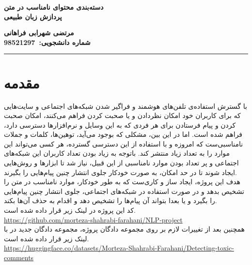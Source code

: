 
\def \Subject {گزارش فاز اول پروژه}
\def \Subject {دسته‌بندی محتوای نامناسب در متن}
\def \Course {پردازش زبان طبیعی}
\def \Author {مرتضی شهرابی فراهانی}
\def \StudentNumber {98521297}

\begin{center}
\vspace{.4cm}
{\bf {\huge \Subject}}\\
{\bf \Large \Course}
\vspace{.2cm}
\end{center}
{\bf \Author }  \\
{\bf شماره دانشجویی:\ \StudentNumber}
\hspace{\fill} 
{\Large \Report} \\
\hrule
\vspace{0.8cm}

\clearpage

\section{مقدمه}
\par
با گسترش استفاده‌ی تلفن‌های هوشمند و فراگیر شدن شبکه‌های اجتماعی و سایت‌هایی که برای کاربران خود امکان نظردادن و یا صحبت کردن فراهم می‌کنند، امکان صحبت کردن و پیام فرستادن برای هر فردی که به این وسایل و نرم‌افزارها دسترسی دارد، فراهم شده است. اما در این بین، مشکلی که بوجود می‌آید، توهین‌ها، کلمات و جملات نامناسبی‌ست که امروزه و با استفاده از این دسترسی گسترده، هر کسی می‌تواند این موارد را به تعداد زیاد منتشر کند. باتوجه به زیاد بودن تعداد کاربران این شبکه‌های اجتماعی و پر تعداد بودن موارد نامناسبی از این قبیل، نیاز شد تا ابزارها و روش‌هایی ایجاد شوند تا در حد امکان، به صورت خودکار جلوی انتشار چنین پیام‌هایی را بگیرند. \\
هدف این پروژه، ایجاد ساز و کار‌ی‌ست که به طور خودکار، موارد نامناسب در متن را تشخیص بدهد و در صورت استفاده در شبکه‌های اجتماعی، جلوی انتشار چنین پیام‌هایی را بگیرد و یا بعدا بتواند آن پیام‌ها را تشخیص دهد و اقدام به حذف آن‌ها بکند. \\
کد این پروژه در لینک‌ زیر قرار داده شده است. \\
\url{https://github.com/morteza-shahrabi-farahani/NLP-project} \\
همچنین بعد از تغییرات لازم بر روی مجموعه دادگان پروژه، مجموعه دادگان جدید در  با لینک زیر قرار داده شده است. \\
\href{https://huggingface.co/datasets/Morteza-Shahrabi-Farahani/Detecting-toxic-comments}{https://huggingface.co/datasets/Morteza-Shahrabi-Farahani/Detecting-toxic-comments}

